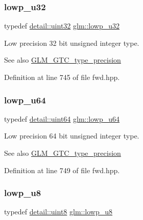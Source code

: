 \subsubsection{\texorpdfstring{lowp\_u32}{lowp\_u32}}
{\footnotesize\ttfamily typedef \mbox{\hyperlink{namespaceglm_1_1detail_ade6cfbf377022aaa391af8cd50489222}{detail\+::uint32}} \mbox{\hyperlink{group__gtc__type__precision_gaba06fae1dd98ca50c017e68345df0365}{glm\+::lowp\+\_\+u32}}}

Low precision 32 bit unsigned integer type. \begin{DoxySeeAlso}{See also}
\mbox{\hyperlink{group__gtc__type__precision}{G\+L\+M\+\_\+\+G\+T\+C\+\_\+type\+\_\+precision}} 
\end{DoxySeeAlso}


Definition at line 745 of file fwd.\+hpp.

\mbox{\label{group__gtc__type__precision_ga61ed4c68a4cffb77cd63cc107119123a}} 
\subsubsection{\texorpdfstring{lowp\_u64}{lowp\_u64}}
{\footnotesize\ttfamily typedef \mbox{\hyperlink{namespaceglm_1_1detail_adec4b19bf4982125e122db2fe03c5810}{detail\+::uint64}} \mbox{\hyperlink{group__gtc__type__precision_ga61ed4c68a4cffb77cd63cc107119123a}{glm\+::lowp\+\_\+u64}}}

Low precision 64 bit unsigned integer type. \begin{DoxySeeAlso}{See also}
\mbox{\hyperlink{group__gtc__type__precision}{G\+L\+M\+\_\+\+G\+T\+C\+\_\+type\+\_\+precision}} 
\end{DoxySeeAlso}


Definition at line 749 of file fwd.\+hpp.

\mbox{\label{group__gtc__type__precision_gae63f942c49a30dbf266b2f13f3efe257}} 
\subsubsection{\texorpdfstring{lowp\_u8}{lowp\_u8}}
{\footnotesize\ttfamily typedef \mbox{\hyperlink{namespaceglm_1_1detail_aef2588f97d090cc19fbbe0c74fe17c8f}{detail\+::uint8}} \mbox{\hyperlink{group__gtc__type__precision_gae63f942c49a30dbf266b2f13f3efe257}{glm\+::lowp\+\_\+u8}}}

